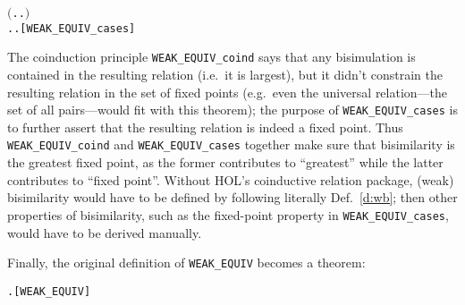 \begin{itemize}
\begin{alltt}
       \ensuremath{(}\HOLSymConst{\HOLTokenForall{}}.  \HOLTokenTransBegin\HOLSymConst{\ensuremath{\tau}}\HOLTokenTransEnd {} \HOLSymConst{\HOLTokenImp{}} \HOLSymConst{\HOLTokenExists{}}.  \HOLSymConst{\HOLTokenEPS}  \HOLSymConst{\HOLTokenConj{}}  \HOLSymConst{\HOLTokenWeakEQ} \ensuremath{)} \HOLSymConst{\HOLTokenConj{}}
       \HOLSymConst{\HOLTokenForall{}}.  \HOLTokenTransBegin\HOLSymConst{\ensuremath{\tau}}\HOLTokenTransEnd {} \HOLSymConst{\HOLTokenImp{}} \HOLSymConst{\HOLTokenExists{}}.  \HOLSymConst{\HOLTokenEPS}  \HOLSymConst{\HOLTokenConj{}}  \HOLSymConst{\HOLTokenWeakEQ} \hfill{[WEAK_EQUIV_cases]}
\end{alltt}
\end{itemize}

The coinduction principle \texttt{WEAK_EQUIV_coind} says that any
bisimulation is contained in the resulting relation (i.e.~it is
largest), but it didn't constrain the resulting relation in the set of
fixed points (e.g.~even the universal relation---the set of all
pairs---would fit with this theorem); the
purpose of \texttt{WEAK_EQUIV_cases} is to
further assert that the resulting relation is indeed a
fixed point. Thus \texttt{WEAK_EQUIV_coind} and \texttt{WEAK_EQUIV_cases}
together make sure that bisimilarity is the greatest
fixed point, as
the former contributes to ``greatest'' while the latter
contributes to ``fixed point''.
%
Without HOL's coinductive relation package, (weak) bisimilarity
would have to be defined by following literally
Def.~\ref{d:wb};  then other properties of bisimilarity, such
as the fixed-point property in \texttt{WEAK_EQUIV_cases}, would have to be
derived manually.

Finally, the original definition of \texttt{WEAK_EQUIV}
becomes a theorem:
\begin{alltt}
\HOLTokenTurnstile{}  \HOLSymConst{\HOLTokenWeakEQ}  \HOLSymConst{\HOLTokenEquiv{}} \HOLSymConst{\HOLTokenExists{}}.    \HOLSymConst{\HOLTokenConj{}}  \hfill{[WEAK_EQUIV]}
\end{alltt}

